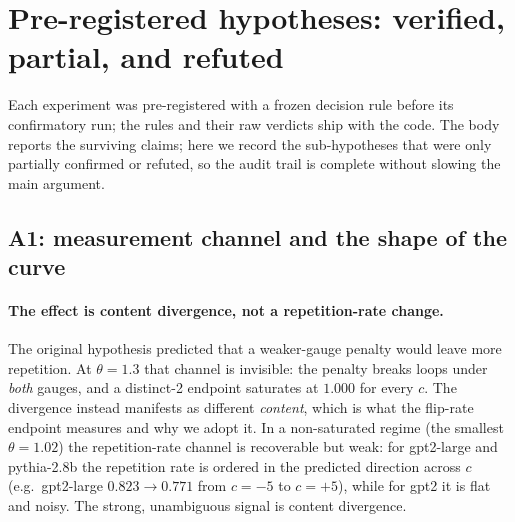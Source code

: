 \documentclass[11pt]{article}
\newcommand{\thp}{\theta}
\begin{document}
\appendix

\section{Pre-registered hypotheses: verified, partial, and refuted}
\label{app:audit}

Each experiment was pre-registered with a frozen decision rule before its confirmatory run; the
rules and their raw verdicts ship with the code. The body reports the surviving claims; here we
record the sub-hypotheses that were only partially confirmed or refuted, so the audit trail is
complete without slowing the main argument.

\subsection{A1: measurement channel and the shape of the curve}

\paragraph{The effect is content divergence, not a repetition-rate change.} The original
hypothesis predicted that a weaker-gauge penalty would leave more repetition. At $\thp=1.3$ that
channel is invisible: the penalty breaks loops under \emph{both} gauges, and a distinct-2
endpoint saturates at $1.000$ for every $c$. The divergence instead manifests as different
\emph{content}, which is what the flip-rate endpoint measures and why we adopt it. In a
non-saturated regime (the smallest $\thp=1.02$) the repetition-rate channel is recoverable but
weak: for gpt2-large and pythia-2.8b the repetition rate is ordered in the predicted direction
across $c$ (e.g.\ gpt2-large $0.823 \to 0.771$ from $c=-5$ to $c=+5$), while for gpt2 it is flat
and noisy. The strong, unambiguous signal is content divergence.
\end{document}
